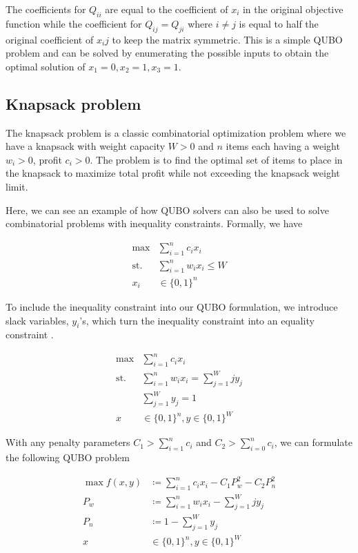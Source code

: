 The coefficients for $Q_{ii}$ are equal to the coefficient of $x_i$ in the original objective function while the coefficient for $Q_{ij} = Q_{ji}$ where $i \neq j$ is equal to half the original coefficient of $x_ij$ to keep the matrix symmetric. This is a simple QUBO problem and can be solved by enumerating the possible inputs to obtain the optimal solution of $x_1 = 0, x_2 = 1, x_3 = 1$.

\subsection{Knapsack problem}
The knapsack problem is a classic combinatorial optimization problem where we have a knapsack with weight capacity $W > 0$ and $n$ items each having a weight $w_i > 0$, profit $c_i > 0$. The problem is to find the optimal set of items to place in the knapsack to maximize total profit while not exceeding the knapsack weight limit.

Here, we can see an example of how QUBO solvers can also be used to solve combinatorial problems with inequality constraints. Formally, we have

\begin{align}
\max &\sum_{i=1}^n c_i x_i \nonumber\\
\mathrm{st.} &\sum_{i=1}^n w_i x_i \leq W \\
x_i &\in \{0,1\}^n \nonumber
\end{align}

To include the inequality constraint into our QUBO formulation, we introduce slack variables, $y_i$'s, which turn the inequality constraint into an equality constraint \cite{b6}.

\begin{align}
\max &\sum_{i=1}^n c_i x_i \nonumber\\
\mathrm{st.} &\sum_{i=1}^n w_i x_i = \sum_{j=1}^W jy_j\\
&\sum_{j=1}^W y_j = 1 \nonumber\\
x &\in \{0,1\}^n, y \in \{0,1\}^W \nonumber
\end{align}

With any penalty parameters $C_1 > \sum_{i=1}^n c_i$ and $C_2 > \sum_{i=0}^n c_i$, we can formulate the following QUBO problem 

\begin{align}
    \max f(x, y) &\coloneqq \sum_{i=1}^n c_i x_i - C_1 P_w^2 - C_2 P_n^2 \\
    P_w &\coloneqq \sum_{i=1}^n w_i x_i - \sum_{j=1}^W jy_j \\
    P_n &\coloneqq 1 - \sum_{j=1}^W y_j \\
    x &\in \{0,1\}^n, y \in \{0,1\}^W \nonumber
\end{align}

